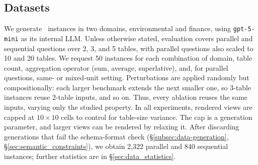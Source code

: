 \subsection{Datasets}
We generate \name\ instances in two domains, environmental and finance, using \texttt{gpt-5-mini} as its internal LLM. Unless otherwise stated, evaluation covers parallel and sequential questions over 2, 3, and 5 tables, with parallel questions also scaled to 10 and 20 tables. We request 50 instances for each combination of domain, table count, aggregation operator (sum, average, superlative), and, for parallel questions, same- or mixed-unit setting. Perturbations are applied randomly but compositionally: each larger benchmark extends the next smaller one, so 3-table instances reuse 2-table inputs, and so on. Thus, every ablation reuses the same inputs, varying only the studied property. In all experiments, rendered views are capped at $10 \times 10$ cells to control for table-size variance. The cap is a generation parameter, and larger views can be rendered by relaxing it. 
After discarding generations that fail the schema-format check (\S\ref{subsec:data-generation}, \S\ref{sec:semantic_constraints}), we obtain 2{,}322 parallel and 840 sequential instances; further statistics are in \S\ref{sec:data_statistics}.
